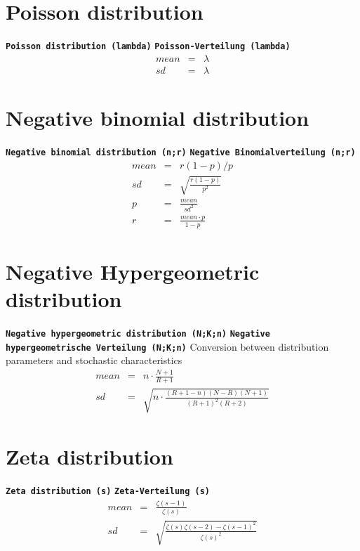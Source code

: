 \documentclass{svmono}
\def\cm#1{\textbf{\texttt{#1}}}
\begin{document}
\section*{Poisson distribution}
\cm{Poisson distribution (lambda)}
\cm{Poisson-Verteilung (lambda)}
\begin{eqnarray*}
mean&=&\lambda\\
sd&=&\lambda
\end{eqnarray*}





\section*{Negative binomial distribution}
\cm{Negative binomial distribution (n;r)}
\cm{Negative Binomialverteilung (n;r)}
\begin{eqnarray*}
mean&=&r(1-p)/p\\
sd&=&\sqrt{\frac{r(1-p)}{p^2}}\\
p&=&\frac{mean}{sd^2}\\
r&=&\frac{mean\cdot p}{1-p}
\end{eqnarray*}





\section*{Negative Hypergeometric distribution}
\cm{Negative hypergeometric distribution (N;K;n)}
\cm{Negative hypergeometrische Verteilung (N;K;n)}
Conversion between distribution parameters and stochastic characteristics
\begin{eqnarray*}
mean&=&n\cdot\frac{N+1}{R+1}\\
sd&=&\sqrt{n\cdot\frac{(R+1-n)(N-R)(N+1)}{(R+1)^2(R+2)}}
\end{eqnarray*}





\section*{Zeta distribution}
\cm{Zeta distribution (s)}
\cm{Zeta-Verteilung (s)}
\begin{eqnarray*}
mean&=&\frac{\zeta(s-1)}{\zeta(s)}\\
sd&=&\sqrt{\frac{\zeta(s)\zeta(s-2)-\zeta(s-1)^2}{\zeta(s)^2}}
\end{eqnarray*}
\end{document}
